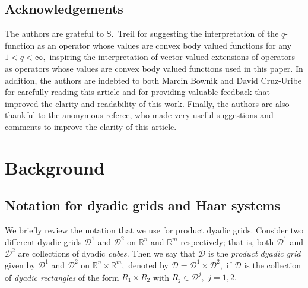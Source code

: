 \documentclass{article}
\theoremstyle{definition}
\theoremstyle{remark}
\numberwithin{equation}{section}
\newcommand{\cD}{\mathcal{D}}
\newcommand{\bfD}{\bm{\mathcal{D}}}
\newcommand{\reals}{\mathbb{R}}
\newcommand{\1}{\mathbf{1}}
\begin{document}
    \subsection*{Acknowledgements}
    The authors are grateful to S.~Treil for suggesting the interpretation of the $q$-function as an operator whose values are convex body valued functions for any $1<q<\infty,$ inspiring the interpretation of vector valued extensions of operators as operators whose values are convex body valued functions used in this paper.
    In addition, the authors are indebted to both Marcin Bownik and David Cruz-Uribe
    for carefully reading this article and for providing valuable feedback
    that improved the clarity and readability of this work.
    Finally, the authors are also thankful to the anonymous referee,
    who made very useful suggestions and comments to improve the clarity of this article.

    \section{Background}
    \label{s:background}

  
    \subsection{Notation for dyadic grids and Haar systems}
    We briefly review the notation that we use for product dyadic grids.
    Consider two different dyadic grids $\cD^1$ and $\cD^2$ on $\reals^n$ and $\reals^m$ respectively;
    that is, both $\cD^1$ and $\cD^2$ are collections of dyadic \emph{cubes}.
    Then we say that $\bfD$ is the \emph{product dyadic grid} given by $\cD^1$ and $\cD^2$ on $\reals^{n} \times \reals^m,$
    denoted by $\bfD = \cD^1 \times \cD^2,$
    if $\bfD$ is the collection of \emph{dyadic rectangles} of the form $R_1 \times R_2$ with $R_j \in \cD^j,$ $j = 1,2.$
\end{document}

